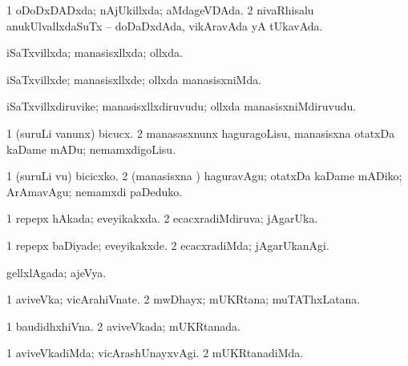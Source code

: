 {{\bentry
{} 
\gl{\gu}
\bmng
\bnum
\num{1} oDoDxDADxda; nAjUkillxda; aMdageVDAda. 
\num{2} nivaRhisalu anukUlvallxdaSuTx -- doDaDxdAda, vikAravAda yA tUkavAda. 
\enum
\emng
\eentry

\bentry
{} 
\gl{\gu}
\expl{}
\bmng
iSaTxvillxda; manasisxllxda; ollxda. 
\emng
\eentry

\bentry
{} 
\gl{\kirxvi}
\expl{}
\bmng
iSaTxvillxde; manasisxllxde; ollxda manasisxniMda. 
\emng
\eentry

\bentry
{} 
\gl{\nA}
\expl{}
\bmng
iSaTxvillxdiruvike; manasisxllxdiruvudu; ollxda manasisxniMdiruvudu. 
\emng
\eentry

\bentry
{} 
\gl{\kirx}


\noindent
\gl{\sakirx}
\expl{}
\bmng
\bnum
\num{1} (suruLi \mo vanunx) bicucx. 
\num{2} manasasxnunx haguragoLisu, manasisxna otatxDa kaDame mADu; nemamxdigoLisu. 
\enum
\emng

\noindent
\gl{\akirx}
\expl{}
\bmng
\bnum
\num{1} (suruLi \mo vu) bicicxko. 
\num{2} (manasisxna \vi) haguravAgu; otatxDa kaDame mADiko; ArAmavAgu; nemamxdi paDeduko. 
\enum
\emng
\eentry

\bentry
{} 
\gl{\gu}
\expl{}
\bmng
\bnum
\num{1} repepx hAkada; eveyikakxda. 
\num{2} ecacxradiMdiruva; jAgarUka. 
\enum
\emng
\eentry

\bentry
{} 
\gl{\kirxvi}
\expl{}
\bmng
\bnum
\num{1} repepx baDiyade; eveyikakxde. 
\num{2} ecacxradiMda; jAgarUkanAgi. 
\enum
\emng
\eentry

\bentry
{} 
\gl{\gu}
\expl{}
\bmng
gellxlAgada; ajeVya. 
\emng
\eentry

\bentry
{} 
\gl{\nA}
\expl{}
\bmng
\bnum
\num{1} aviveVka; vicArahiVnate. 
\num{2} mwDhayx; mUKRtana; muTAThxLatana. 
\enum
\emng
\eentry

\bentry
{} 
\gl{\gu}
\expl{}
\bmng
\bnum
\num{1} baudidhxhiVna. 
\num{2} aviveVkada; mUKRtanada. 
\enum
\emng
\eentry

\bentry 
{} 
\gl{\kirxvi}
\expl{}
\bmng
\bnum
\num{1} aviveVkadiMda; vicArashUnayxvAgi. 
\num{2} mUKRtanadiMda. 
\enum
\emng
\eentry

}}
